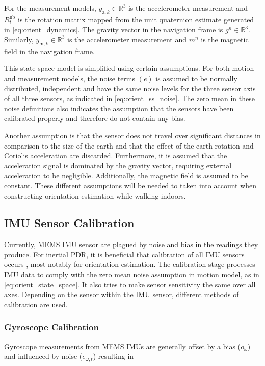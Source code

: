 For the measurement models, $y_{\mathrm{a}, k}\in \mathbb{R}^3$ is the accelerometer measurement and $R^\mathrm{nb}_t$ is the rotation matrix mapped from the unit quaternion estimate generated in \eqref{eq:orient_dynamics}. The gravity vector in the navigation frame is $g^n \in \mathbb{R}^3$. Similarly, $y_{\mathrm{m}, k}\in \mathbb{R}^3$ is the accelerometer measurement and $m^n$ is the magnetic field in the navigation frame. \par 

This state space model is simplified using certain assumptions.
For both motion and measurement models, the noise terms  $(e)$ is assumed to be normally distributed, independent and have the same noise levels for the three sensor axis of all three sensors, as indicated in \eqref{eq:orient_ss_noise}. The zero mean in these noise definitions also indicates the assumption that the sensors have been calibrated properly and therefore do not contain any bias. \par

Another assumption is that the sensor does not travel over significant distances in comparison to the size of the earth \cite{Kok2017} and that the effect of the earth rotation and Coriolis acceleration are discarded. Furthermore, it is assumed that the acceleration signal is dominated by the gravity vector, requiring external acceleration to be negligible. Additionally, the magnetic field is assumed to be constant. These different assumptions will be needed to taken into account when constructing orientation estimation while walking indoors.

\subsection{\ac{IMU} Sensor Calibration}
\label{sec:sensor_calibration}
Currently, \ac{MEMS} \ac{IMU} sensor are plagued by noise and bias in the readings they produce. For inertial \ac{PDR}, it is beneficial that  calibration of all IMU sensors occurs \cite{Moder2017}, most notably for orientation estimation. The calibration stage processes IMU data to comply with the zero mean noise assumption in motion model, as in \eqref{eq:orient_state_space}. It also tries to make sensor sensitivity the same over all axes. Depending on the sensor within the \ac{IMU} sensor, different methods of calibration are used. \par 

\subsubsection{Gyroscope Calibration}
Gyroscope measurements from MEMS IMUs are generally offset by a bias ($o_\omega$) and influenced by noise ($e_{\omega, t}$)  resulting in

